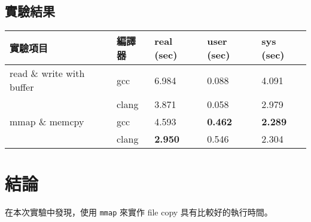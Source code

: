 \documentclass{ctexart}
\begin{document}
\subsection{實驗結果}
\begin{center}
\begin{tabular}{ l l l l l} 
實驗項目                    & 編譯器    & real (sec)        & user (sec)    & sys (sec)             \\
\toprule
read \& write with buffer   & gcc       & 6.984             & 0.088             & 4.091             \\
                            & clang     & 3.871             & 0.058             & 2.979             \\
\hline
mmap \& memcpy              & gcc       & 4.593             & \textbf{0.462}    & \textbf{2.289}    \\
                            & clang     & \textbf{2.950}    & 0.546             & 2.304             \\
\hline
\end{tabular}
\end{center}
\section{結論}
在本次實驗中發現，使用 \texttt{mmap} 來實作 file copy 具有比較好的執行時間。
\end{document}
